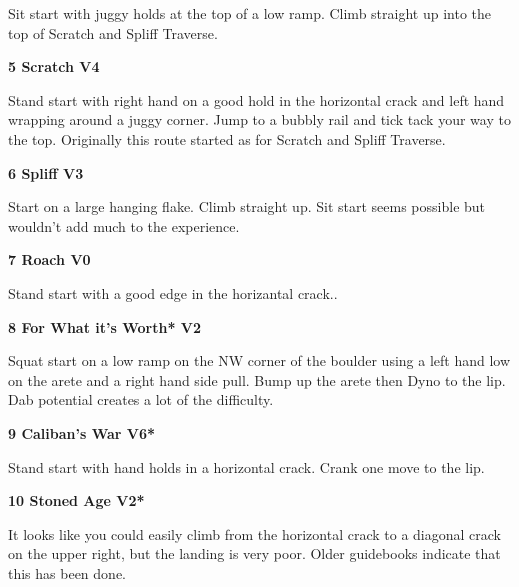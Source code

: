 \begin{multicols}{2}
\begin{adjustwidth}{0.5cm}{}
					\begin{adjustwidth}{0.5cm}{}				
					Sit start with juggy holds at the top of a low ramp. Climb straight up into the top of Scratch and Spliff Traverse.
					\end{adjustwidth}
				\end{adjustwidth}
			\label{rt:Scratch}
\colorbox{RoyalBlue!20}{
\parbox{0.95\linewidth}{
\textbf{
5 Scratch V4  
}
}
}

			\begin{adjustwidth}{0.5cm}{}				
			Stand start with right hand on a good hold in the horizontal crack and left hand wrapping around a juggy corner. Jump to a bubbly rail and tick tack your way to the top. Originally this route started as for Scratch and Spliff Traverse.
			\end{adjustwidth}

			\label{rt:Spliff}
\colorbox{green!20}{
\parbox{0.95\linewidth}{
\textbf{
6 Spliff V3  \warn
}
}
}

			\begin{adjustwidth}{0.5cm}{}				
			Start on a large hanging flake. Climb straight up. Sit start seems possible but wouldn't add much to the experience.
			\end{adjustwidth}
			\label{rt:Roach}
\colorbox{green!20}{
\parbox{0.95\linewidth}{
\textbf{
7 Roach V0  
}
}
}

			\begin{adjustwidth}{0.5cm}{}				
			Stand start with a good edge in the horizantal crack..
			\end{adjustwidth}
			\label{rt:For What it's Worth}
\colorbox{green!20}{
\parbox{0.95\linewidth}{
\textbf{
8 For What it's Worth* V2  
}
}
}

			\begin{adjustwidth}{0.5cm}{}				
			Squat start on a low ramp on the NW corner of the boulder using a left hand low on the arete and a right hand side pull. Bump up the arete then Dyno to the lip. Dab potential creates a lot of the difficulty.
			\end{adjustwidth}

			\label{rt:Caliban's War}
\colorbox{RoyalBlue!20}{
\parbox{0.95\linewidth}{
\textbf{
9 Caliban's War V6*  
}
}
}

			\begin{adjustwidth}{0.5cm}{}				
			Stand start with hand holds in a horizontal crack. Crank one move to the lip.
			\end{adjustwidth}
			\label{rt:Stoned Age}
\colorbox{green!20}{
\parbox{0.95\linewidth}{
\textbf{
10 Stoned Age V2*  
}
}
}

			\begin{adjustwidth}{0.5cm}{}				
			It looks like you could easily climb from the horizontal crack to a diagonal crack on the upper right, but the landing is very poor. Older guidebooks indicate that this has been done.
			\end{adjustwidth}
\end{multicols}
\clearpage